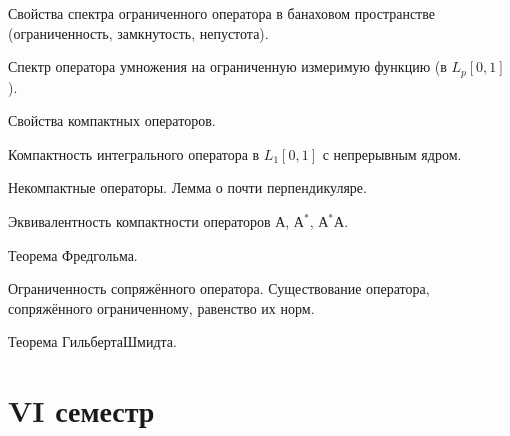 \documentclass[a4paper]{article}
\begin{document}
\begin{nums}{-2}
\item Свойства спектра ограниченного оператора в банаховом пространстве (ограниченность,
замкнутость, непустота).
\item Спектр оператора умножения на ограниченную измеримую функцию (в $L_p[0,1]$).
\item Свойства компактных операторов.
\item Компактность интегрального оператора в $L_1[0,1]$ с непрерывным ядром.
\item Некомпактные операторы. Лемма о почти перпендикуляре.
\item Эквивалентность компактности операторов $А$, $А^*$, $А^*А$.
\item Теорема Фредгольма.
\item Ограниченность сопряжённого оператора. Существование оператора, сопряжённого
ограниченному, равенство их норм.
\item Теорема Гильберта\ч Шмидта.
\end{nums}

\pagebreak

\section*{VI семестр}
\end{document}
